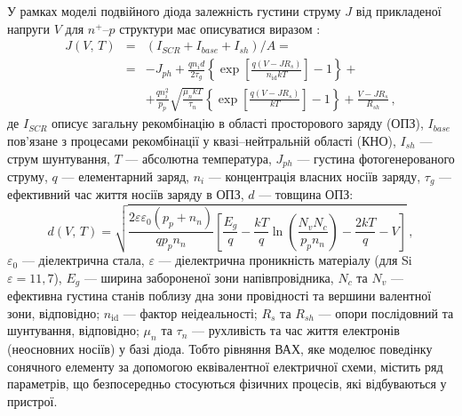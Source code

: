 У рамках моделі подвійного діода залежність густини струму $J$ від прикладеної напруги $V$ для  $n^+$--$p$ структури має описуватися  виразом \cite{2Diod:Ishaque,2Diod:Buhler}:
\begin{eqnarray}
\label{eqSSCIV}
\nonumber J(V,\,T)&=&\left(I_{SCR}+I_{base}+I_{sh}\right)/A=\\
\nonumber &=&-J_{ph}+\frac{qn_id}{2\tau_{g}}\left\{\exp \left[\frac{q(V-JR_s)}{n_\mathrm{id}kT}\right]-1\right\}+\\
&&+\frac{qn_i^2}{p_p}\sqrt{\frac{\mu_nkT}{\tau_n}}\left\{\exp \left[\frac{q(V-JR_s)}{kT}\right]-1\right\}+\frac{V-JR_s}{R_{sh}}\,,
\end{eqnarray}
де
$I_{SCR}$ описує загальну рекомбінацію в області просторового заряду (ОПЗ),
$I_{base}$ пов'язане з процесами рекомбінації у квазі--нейтральній області (КНО),
$I_{sh}$ ---  струм шунтування,
$T$ --- абсолютна температура,
$J_{ph}$ --- густина фотогенерованого струму,
$q$ --- елементарний заряд,
$n_i$ --- концентрація власних носіїв заряду,
$\tau_{g}$  --- ефективний час життя носіїв заряду в ОПЗ,
$d$ --- товщина ОПЗ:
\begin{equation}
\label{eqW}
    d(V,\,T)=\sqrt{\frac{2 \varepsilon \varepsilon_0(p_p+n_n)}{q p_p n_n}\left[\frac{E_g}{q}-\frac{kT}{q}\ln\left(\frac{N_vN_c}{p_pn_n}\right)-\frac{2kT}{q}-V\right]} \,,
\end{equation}
$\varepsilon_0$ --- діелектрична стала,
$\varepsilon$ --- діелектрична проникність матеріалу (для Si $\varepsilon=11,7$),
$E_g$ --- ширина забороненої зони напівпровідника,
$N_c$ та $N_v$ --- ефективна густина станів поблизу дна зони провідності та вершини валентної зони, відповідно;
$n_\mathrm{id}$ --- фактор неідеальності;
$R_s$ та $R_{sh}$ --- опори послідовний та шунтування, відповідно;
$\mu_n$ та $\tau_n$ --- рухливість та час життя електронів (неосновних носіїв) у базі діода.
Тобто
рівняння ВАХ, яке моделює поведінку сонячного елементу за допомогою еквівалентної електричної схеми,
містить ряд параметрів, що безпосередньо стосуються фізичних процесів, які відбуваються у пристрої.

